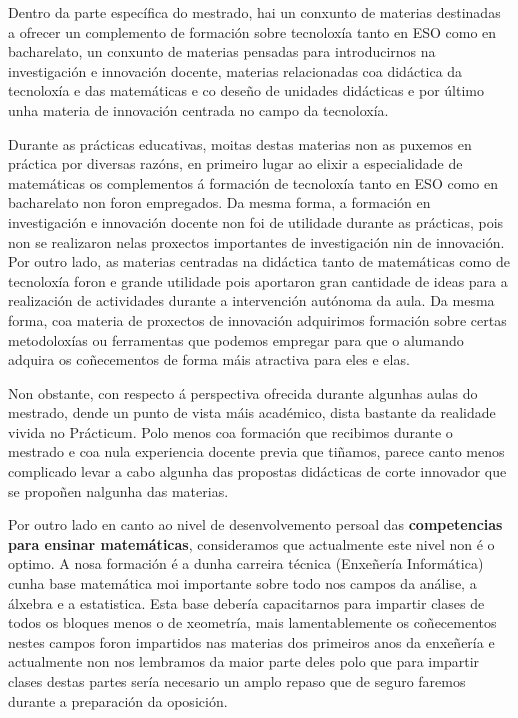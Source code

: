 Dentro da parte específica do mestrado, hai un conxunto de materias destinadas a ofrecer un complemento de formación sobre tecnoloxía tanto en ESO como en bacharelato, un conxunto de materias pensadas para introducirnos na investigación e innovación docente, materias relacionadas coa didáctica da tecnoloxía e das matemáticas e co deseño de unidades didácticas e por último unha materia de innovación centrada no campo da tecnoloxía.

Durante as prácticas educativas, moitas destas materias non as puxemos en práctica por diversas razóns, en primeiro lugar ao elixir a especialidade de matemáticas os complementos á formación de tecnoloxía tanto en ESO como en bacharelato non foron empregados. Da mesma forma, a formación en investigación e innovación docente non foi de utilidade durante as prácticas, pois non se realizaron nelas proxectos importantes de investigación nin de innovación. Por outro lado, as materias centradas na didáctica tanto de matemáticas como de tecnoloxía foron e grande utilidade pois aportaron gran cantidade de ideas para a realización de actividades durante a intervención autónoma da aula. Da mesma forma, coa materia de proxectos de innovación adquirimos formación sobre certas metodoloxías ou ferramentas que podemos empregar para que o alumando adquira os coñecementos de forma máis atractiva para eles e elas.

Non obstante, con respecto á perspectiva ofrecida durante algunhas aulas do mestrado, dende un punto de vista máis académico, dista bastante da realidade vivida no Prácticum. Polo menos coa formación que recibimos durante o mestrado e coa nula experiencia docente previa que tiñamos, parece canto menos complicado levar a cabo algunha das propostas didácticas de corte innovador que se propoñen nalgunha das materias.


Por outro lado en canto ao nivel de desenvolvemento persoal das \textbf{competencias para ensinar matemáticas}, consideramos que actualmente este nivel non é o optimo. A nosa formación é a dunha carreira técnica (Enxeñería Informática) cunha base matemática moi importante sobre todo nos campos da análise, a álxebra e a estatistica. Esta base debería capacitarnos para impartir clases de todos os bloques menos o de xeometría, mais lamentablemente os coñecementos nestes campos foron impartidos nas materias dos primeiros anos da enxeñería e actualmente non nos lembramos da maior parte deles polo que para impartir clases destas partes sería necesario un amplo repaso que de seguro faremos durante a preparación da oposición.

